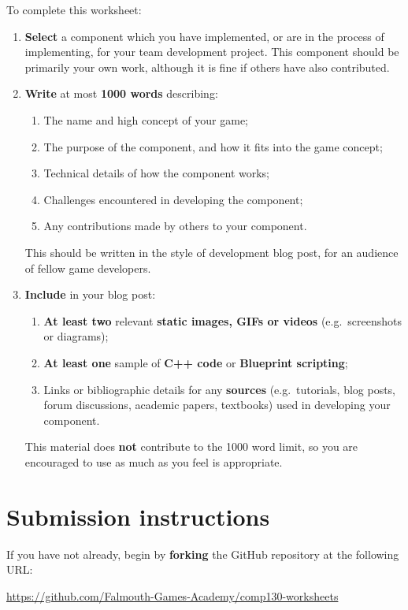 \documentclass{../../fal_assignment}
\begin{document}
To complete this worksheet:
\begin{enumerate}[label=(\alph*)]
	\item \textbf{Select} a component which you have implemented, or are in the process of implementing,
		for your team development project.
		This component should be primarily your own work, although it is fine if others have also contributed.
	\item \textbf{Write} at most \textbf{1000 words} describing:
		\begin{enumerate}[label=(\roman*)]
			\item The name and high concept of your game;
			\item The purpose of the component, and how it fits into the game concept;
			\item Technical details of how the component works;
			\item Challenges encountered in developing the component;
			\item Any contributions made by others to your component.
		\end{enumerate}
		This should be written in the style of development blog post, for an audience of fellow game developers.
	\item \textbf{Include} in your blog post:
		\begin{enumerate}[label=(\roman*)]
			\item \textbf{At least two} relevant \textbf{static images, GIFs or videos} (e.g.\ screenshots or diagrams);
			\item \textbf{At least one} sample of \textbf{C++ code} or \textbf{Blueprint scripting};
			\item Links or bibliographic details for any \textbf{sources}
				(e.g.\ tutorials, blog posts, forum discussions, academic papers, textbooks)
				used in developing your component.
		\end{enumerate}
		This material does \textbf{not} contribute to the 1000 word limit, so you are encouraged to use
		as much as you feel is appropriate.
\end{enumerate}

\section*{Submission instructions}

If you have not already, begin by \textbf{forking} the GitHub repository at the following URL:

\url{https://github.com/Falmouth-Games-Academy/comp130-worksheets}
\end{document}
